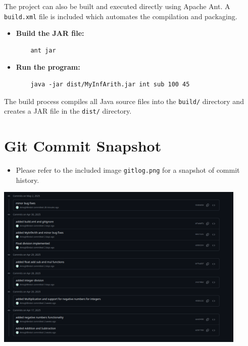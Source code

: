 \documentclass[12pt]{article}
\begin{document}
The project can also be built and executed directly using Apache Ant. A \texttt{build.xml} file is included which automates the compilation and packaging.

\begin{itemize}
    \item \textbf{Build the JAR file:}
    \begin{verbatim}
    ant jar
    \end{verbatim}

    \item \textbf{Run the program:}
    \begin{verbatim}
    java -jar dist/MyInfArith.jar int sub 100 45
    \end{verbatim}
\end{itemize}

The build process compiles all Java source files into the \texttt{build/} directory and creates a JAR file in the \texttt{dist/} directory.


\section{Git Commit Snapshot}
\begin{itemize}
    \item Please refer to the included image \texttt{gitlog.png} for a snapshot of commit history.
\end{itemize}
\begin{center}
\includegraphics[width=0.9\textwidth]{gitlog.png}
\end{center}
\end{document}
